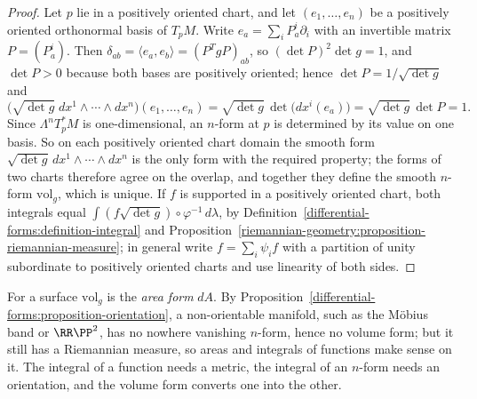 \begin{proof}
Let $p$ lie in a positively oriented chart, and let $(e_1, \ldots, e_n)$ be a positively oriented orthonormal basis of $T_pM$. Write $e_a = \sum_iP^i_a\partial_i$ with an
invertible matrix $P = (P^i_a)$. Then $\delta_{ab} = \langle e_a, e_b\rangle = (P^TgP)_{ab}$, so $(\det P)^2\det g = 1$, and $\det P > 0$ because both bases are
positively oriented; hence $\det P = 1/\sqrt{\det g}$ and
\[
\bigl(\sqrt{\det g}\;dx^1 \wedge \cdots \wedge dx^n\bigr)(e_1, \ldots, e_n) = \sqrt{\det g}\,\det\bigl(dx^i(e_a)\bigr) = \sqrt{\det g}\,\det P = 1 .
\]
Since $\Lambda^nT^*_pM$ is one-dimensional, an $n$-form at $p$ is determined by its value on one basis. So on each positively oriented chart domain the smooth form
$\sqrt{\det g}\,dx^1 \wedge \cdots \wedge dx^n$ is the only form with the required property; the forms of two charts therefore agree on the overlap, and together they
define the smooth $n$-form $\mathrm{vol}_g$, which is unique. If $f$ is supported in a positively oriented chart, both integrals equal
$\int(f\sqrt{\det g}) \circ \varphi^{-1}\,d\lambda$, by Definition~\ref{differential-forms:definition-integral} and
Proposition~\ref{riemannian-geometry:proposition-riemannian-measure}; in general write $f = \sum_i\psi_if$ with a partition of unity subordinate to positively oriented
charts and use linearity of both sides.
\end{proof}

For a surface $\mathrm{vol}_g$ is the \emph{area form} $dA$. By Proposition~\ref{differential-forms:proposition-orientation}, a non-orientable manifold, such as the
M\"obius band or $\RR\PP^2$, has no nowhere vanishing $n$-form, hence no volume form; but it still has a Riemannian measure, so areas and integrals of functions make sense
on it. The integral of a function needs a metric, the integral of an $n$-form needs an orientation, and the volume form converts one into the other.

